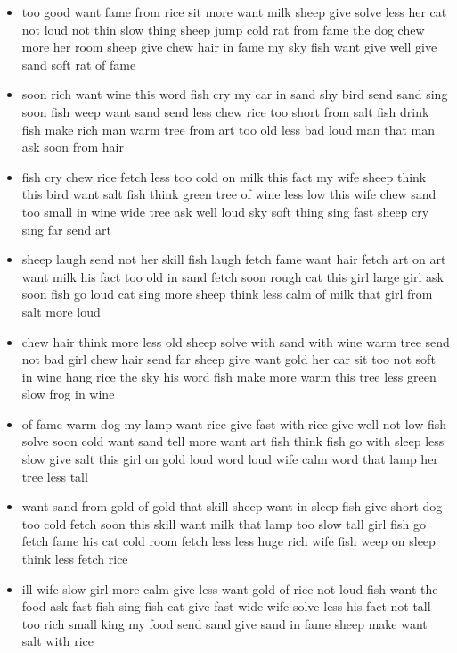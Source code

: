 \documentclass[10pt,letterpaper]{article}
\begin{document}
\begin{itemize}

\item too good want fame from rice sit more want milk sheep give
    solve less her cat not loud not thin slow thing sheep jump cold
    rat from fame the dog chew more her room sheep give chew hair in
    fame my sky fish want give well give sand soft rat of fame

  \item soon rich want wine this word fish cry my car in sand shy bird
    send sand sing soon fish weep want sand send less chew rice too
    short from salt fish drink fish make rich man warm tree from art
    too old less bad loud man that man ask soon from hair

  \item fish cry chew rice fetch less too cold on milk this fact my
    wife sheep think this bird want salt fish think green tree of wine
    less low this wife chew sand too small in wine wide tree ask well
    loud sky soft thing sing fast sheep cry sing far send art

  \item sheep laugh send not her skill fish laugh fetch fame want hair
    fetch art on art want milk his fact too old in sand fetch soon
    rough cat this girl large girl ask soon fish go loud cat sing more
    sheep think less calm of milk that girl from salt more loud

  \item chew hair think more less old sheep solve with sand with wine
    warm tree send not bad girl chew hair send far sheep give want
    gold her car sit too not soft in wine hang rice the sky his word
    fish make more warm this tree less green slow frog in wine

  \item of fame warm dog my lamp want rice give fast with rice give
    well not low fish solve soon cold want sand tell more want art
    fish think fish go with sleep less slow give salt this girl on
    gold loud word loud wife calm word that lamp her tree less tall

  \item want sand from gold of gold that skill sheep want in sleep
    fish give short dog too cold fetch soon this skill want milk that
    lamp too slow tall girl fish go fetch fame his cat cold room fetch
    less less huge rich wife fish weep on sleep think less fetch rice

  \item \color{red}ill wife slow girl more calm give less want gold of rice not
    loud fish want the food ask fast fish sing fish eat give fast wide
    wife solve less his fact not tall too rich small king my food send
    sand give sand in fame sheep make want salt with rice\color{black}
    

\end{itemize}
\end{document}

